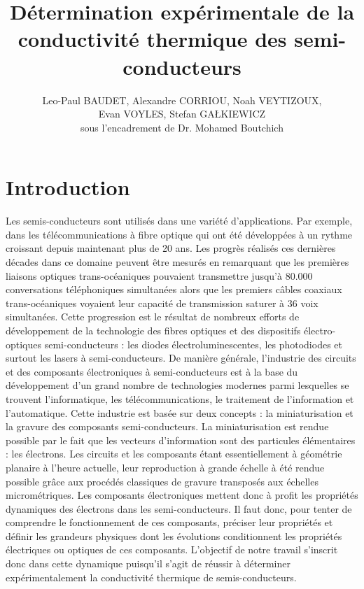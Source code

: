\documentclass[10pt,a4paper]{report}
\begin{document}
\title{Détermination expérimentale de la conductivité thermique des semi-conducteurs}
\author{Leo-Paul BAUDET,  Alexandre CORRIOU, Noah VEYTIZOUX, \\Evan VOYLES, Stefan GA\L KIEWICZ \\sous l'encadrement de
Dr. Mohamed Boutchich}
\maketitle
\tableofcontents
\chapter{Introduction}
Les semis-conducteurs sont utilisés dans une variété d'applications. Par exemple, dans les télécommunications à fibre optique qui ont été développées à un rythme croissant depuis maintenant plus de 20 ans. Les progrès réalisés ces dernières décades dans ce domaine peuvent être mesurés en remarquant que les premières liaisons optiques trans-océaniques pouvaient transmettre jusqu'à 80.000 conversations téléphoniques simultanées alors que les premiers câbles coaxiaux trans-océaniques voyaient leur capacité de transmission saturer à 36 voix simultanées. Cette progression est le résultat de nombreux efforts de développement de la technologie des fibres optiques et des dispositifs électro-optiques semi-conducteurs : les diodes électroluminescentes, les photodiodes et surtout les lasers à semi-conducteurs. De manière générale, l’industrie des circuits et des composants électroniques à semi-conducteurs est à la base du développement d’un grand nombre de technologies modernes parmi lesquelles se trouvent l’informatique, les télécommunications, le traitement de l'information et l’automatique. Cette industrie est basée sur deux concepts : la miniaturisation et la gravure des composants semi-conducteurs. La miniaturisation est rendue possible par le fait que les vecteurs d’information sont des particules élémentaires : les électrons. Les circuits et les composants étant essentiellement à géométrie planaire à l’heure actuelle, leur reproduction à grande échelle à été rendue possible grâce aux procédés classiques de gravure transposés aux échelles micrométriques. Les composants électroniques mettent donc à profit les propriétés dynamiques des électrons dans les semi-conducteurs. Il faut donc, pour tenter de comprendre le fonctionnement de ces composants, préciser leur propriétés et définir les grandeurs physiques dont les évolutions conditionnent les propriétés électriques ou optiques de ces composants. L'objectif de notre travail s'inscrit donc dans cette dynamique puisqu'il s'agit de réussir à déterminer expérimentalement la conductivité thermique de semis-conducteurs.
\end{document}
